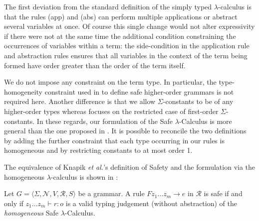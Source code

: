\documentclass{llncs}
\begin{document}
The first deviation from the standard definition of the simply typed $\lambda$-calculus is that the rules {\sf (app)} and {\sf (abs)}
can perform multiple applications or abstract several variables at once.
Of course this single change would not alter expressivity if there were not at the same time the additional condition
constraining the occurrences of variables within a term:  the side-condition in the application rule and abstraction rules ensures that all variables in the context of the term being formed have order greater than the order of the term itself.


We do not impose any constraint on the term type. In particular, the type-homogeneity constraint used in \cite{KNU02} to define safe higher-order grammars is not required here. Another difference is that we allow $\Sigma$-constants to be of any higher-order types whereas \cite{KNU02} focuses on the restricted case of first-order $\Sigma$-constants.
In these regards, our formulation of the Safe $\lambda$-Calculus is more general than the one proposed in \cite{safety-mirlong2004}.
It is possible to reconcile the two definitions by adding the further constraint that each type occurring in our rules is homogeneous
and by restricting constants to at most order 1.

The equivalence of Knapik \emph{et al.}'s definition of Safety and
the formulation via the homogeneous $\lambda$-calculus is shown in \cite{demirandathesis}:
\begin{proposition} Let $G = \langle \Sigma, \mathcal{N}, V, \mathcal{R}, S \rangle$ be a grammar.
A rule $F z_1 \ldots z_m \rightarrow e$ in $\mathcal{R}$ is safe if and only if
$ z_1 \ldots z_m \vdash r : o$
is a valid typing judgement (without abstraction) of the \emph{homogeneous} Safe $\lambda$-Calculus.
\end{proposition}
\end{document}
